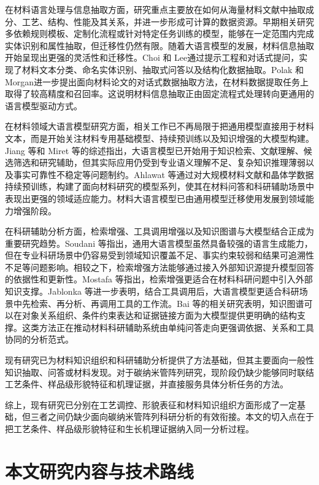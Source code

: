 在材料语言处理与信息抽取方面，研究重点主要放在如何从海量材料文献中抽取成分、工艺、结构、性能及其关系，并进一步形成可计算的数据资源。早期相关研究多依赖规则模板、定制化流程或针对特定任务训练的模型，能够在一定范围内完成实体识别和属性抽取，但迁移性仍然有限。随着大语言模型的发展，材料信息抽取开始呈现出更强的灵活性和迁移性。Choi 和 Lee\cite{Choi2024}通过提示工程和对话式提问，实现了材料文本分类、命名实体识别、抽取式问答以及结构化数据抽取。Polak 和 Morgan\cite{Polak2024}进一步提出面向材料论文的对话式数据抽取方法，在材料数据提取任务上取得了较高精度和召回率。这说明材料信息抽取正由固定流程式处理转向更通用的语言模型驱动方式。

在材料领域大语言模型研究方面，相关工作已不再局限于把通用模型直接用于材料文本，而是开始关注材料专用基础模型、持续预训练以及知识增强的大模型构建。Jiang 等\cite{Jiang2025}和 Miret 等\cite{Miret2025}的综述指出，大语言模型已开始用于知识检索、文献理解、候选筛选和研究辅助，但其实际应用仍受到专业语义理解不足、复杂知识推理薄弱以及事实可靠性不稳定等问题制约。Ahlawat 等\cite{Ahlawat2026LLaMat}通过对大规模材料文献和晶体学数据持续预训练，构建了面向材料研究的模型系列，使其在材料问答和科研辅助场景中表现出更强的领域适应能力。材料大语言模型已由通用模型迁移使用发展到领域能力增强阶段。

在科研辅助分析方面，检索增强、工具调用增强以及知识图谱与大模型结合正成为重要研究趋势。Soudani 等\cite{Soudani2024}指出，通用大语言模型虽然具备较强的语言生成能力，但在专业科研场景中仍容易受到领域知识覆盖不足、事实约束较弱和结果可追溯性不足等问题影响。相较之下，检索增强方法能够通过接入外部知识源提升模型回答的依据性和更新性\cite{Gao2023RAGSurvey}。Mostafa 等\cite{Mostafa2024}指出，检索增强更适合在材料科研问题中引入外部知识支撑。Jablonka 等\cite{Jablonka2023Hackathon}进一步表明，结合工具调用后，大语言模型更适合科研场景中先检索、再分析、再调用工具的工作流。Bai 等\cite{Bai2025}的相关研究表明，知识图谱可以在对象关系组织、条件约束表达和证据链接方面为大模型提供更明确的结构支撑。这类方法正在推动材料科研辅助系统由单纯问答走向更强调依据、关系和工具协同的分析范式。

现有研究已为材料知识组织和科研辅助分析提供了方法基础，但其主要面向一般性知识抽取、问答或材料发现。对于碳纳米管阵列研究，现阶段仍缺少能够同时联结工艺条件、样品级形貌特征和机理证据，并直接服务具体分析任务的方法。

综上，现有研究已分别在工艺调控、形貌表征和材料知识组织方面形成了一定基础，但三者之间仍缺少面向碳纳米管阵列科研分析的有效衔接。本文的切入点在于把工艺条件、样品级形貌特征和生长机理证据纳入同一分析过程。

\section{本文研究内容与技术路线}

